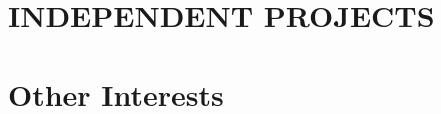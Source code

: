 \documentclass[margin, 10pt]{res} %
\begin{document}
\begin{resume}
\section{INDEPENDENT PROJECTS}


\section{Other Interests}


\end{resume}
\end{document}

